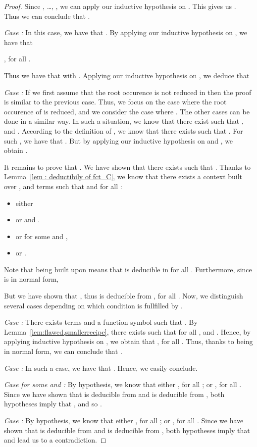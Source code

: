 \begin{proof}
Since , \ldots, , we can apply our inductive hypothesis
on . This gives us . Thus we can conclude that
.

\smallskip{}

\emph{Case :} In
this case, we have that . By applying our inductive hypothesis on , we have that 
\begin{center}
, for all . 
\end{center}
Thus we
have that  with .
Applying our inductive hypothesis on , we
deduce that 



\smallskip{}

\emph{Case :} If we first assume that
the root occurence  is not reduced in  then the proof
is similar to the previous case. Thus, we focus on the case where the root
occurence of  is reduced, and we consider the case where . The other cases can be done in a similar way.
In such a situation, we know that there exist  such that
,  and
 . According to the definition of , we
 know that there exists  such that
 . For such , we have that
 . But by applying our inductive hypothesis on
  and , we obtain .

\bigskip{}

It remains to prove that . We have shown that there exists 
such that . Thanks to Lemma~\ref{lem : deductibily of fct_C},
we know that there exists a context  built over , and
 terms such that  and
for all :
\begin{itemize}
\item either 
\item or  and .
\item or  for some  and ,
\item or .
\end{itemize}

Note that  being built upon  means that
 is deducible in  for all . Furthermore,
since  is in normal form,

But we have shown that
, thus
 is deducible from , for all . Now, we distinguish several cases depending on
which condition is fullfilled by .
\smallskip{}

\emph{Case :} There exists  terms and a function symbol  such that . By Lemma~\ref{lem:flawed,smallerrecipe}, there exists  such that for all , 
and . Hence, by applying inductive hypothesis on
, we obtain that , for all . Thus,
thanks to  being in normal form, we can conclude that .

\smallskip{}

\emph{Case :} In
  such a case, we have that 
. Hence, we easily conclude.

\smallskip{}

\emph{Case  for some  and :} {By
hypothesis, we know that either ,
for all ; or , for
all .
Since we have shown that  is deducible from 
and  is deducible from , both
hypotheses imply that , and so .}

\smallskip{}

\emph{Case :} 
{By hypothesis, we know that either ,
for all ; or , for
all .
Since we have shown that  is deducible from 
and  is deducible from , both
hypotheses imply that  and lead us to a contradiction.}
\end{proof}



